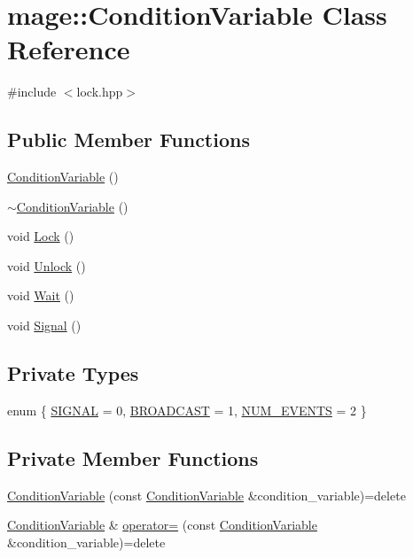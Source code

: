 \hypertarget{classmage_1_1_condition_variable}{}\section{mage\+:\+:Condition\+Variable Class Reference}
\label{classmage_1_1_condition_variable}


{\ttfamily \#include $<$lock.\+hpp$>$}

\subsection*{Public Member Functions}
\begin{DoxyCompactItemize}
\item 
\hyperlink{classmage_1_1_condition_variable_a09073f0affc601f052fce541a17ba559}{Condition\+Variable} ()
\item 
\hyperlink{classmage_1_1_condition_variable_accd5253beb65b2904428afdb889cf00b}{$\sim$\+Condition\+Variable} ()
\item 
void \hyperlink{classmage_1_1_condition_variable_acb0fa4a842b6979ac35c70dab0f43813}{Lock} ()
\item 
void \hyperlink{classmage_1_1_condition_variable_a3b3fe63417b7d7adedc9fe015fc7feea}{Unlock} ()
\item 
void \hyperlink{classmage_1_1_condition_variable_abc279c54285145d981f409c2d110c85a}{Wait} ()
\item 
void \hyperlink{classmage_1_1_condition_variable_a09e52f0d51c10ee565a895d2444175d9}{Signal} ()
\end{DoxyCompactItemize}
\subsection*{Private Types}
\begin{DoxyCompactItemize}
\item 
enum \{ \hyperlink{classmage_1_1_condition_variable_a600fb5094237230f6b260b31d6fb0945a83361ddf52d1973875f7a48ac4bccf94}{S\+I\+G\+N\+AL} = 0, 
\hyperlink{classmage_1_1_condition_variable_a600fb5094237230f6b260b31d6fb0945a5863233d3c1e62ca806753b0d175199f}{B\+R\+O\+A\+D\+C\+A\+ST} = 1, 
\hyperlink{classmage_1_1_condition_variable_a600fb5094237230f6b260b31d6fb0945a2c43161b9ddfb393865606bfb3a51fac}{N\+U\+M\+\_\+\+E\+V\+E\+N\+TS} = 2
 \}
\end{DoxyCompactItemize}
\subsection*{Private Member Functions}
\begin{DoxyCompactItemize}
\item 
\hyperlink{classmage_1_1_condition_variable_add5ccf5807a94588c28621141df334d3}{Condition\+Variable} (const \hyperlink{classmage_1_1_condition_variable}{Condition\+Variable} \&condition\+\_\+variable)=delete
\item 
\hyperlink{classmage_1_1_condition_variable}{Condition\+Variable} \& \hyperlink{classmage_1_1_condition_variable_ac83eae5353cd004ee06fe2376e5bdbf4}{operator=} (const \hyperlink{classmage_1_1_condition_variable}{Condition\+Variable} \&condition\+\_\+variable)=delete
\end{DoxyCompactItemize}
